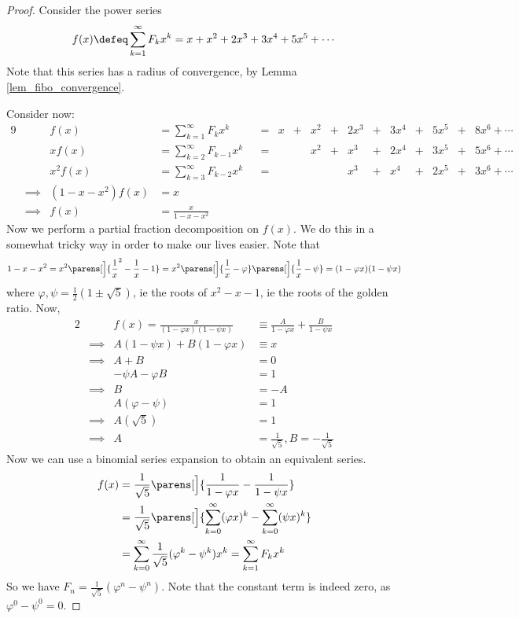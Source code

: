 \begin{proof}
 Consider the power series
 \begin{equation*}
  f(x) \defeq \sum_{k=1}^\infty F_k x^k = x + x^2 + 2x^3 + 3x^4 + 5x^5
      + \dotsb
 \end{equation*}
 Note that this series has a radius of convergence, by Lemma
 \ref{lem_fibo_convergence}.

 Consider now:
 \begin{alignat*}9
  && f(x) &= \sum_{k = 1}^\infty F_k x^k
      &&={}& x &+{}& x^2 &+{}& 2x^3 &+{}&
          3x^4 &+{}& 5x^5 &+{}& 8x^6 + \dotsb \\
  && x f(x) &= \sum_{k = 2}^\infty F_{k - 1} x^k
      &&={}& &&x^2 &+{}& x^3 &+{}& 2x^4 &+{}&
          3x^5 &+{}& 5x^6 + \dotsb \\
  && x^2 f(x) &= \sum_{k = 3}^\infty F_{k - 2}x^k
      &&={}& &&&& x^3 &+{}& x^4 &+{}& 2x^5 &+{}& 3x^6 + \dotsb \\
  &\implies{}& (1 - x - x^2) f(x) &= x \\
  &\implies{}& f(x) &= \frac x{1 - x - x^2}
 \end{alignat*}
 Now we perform a partial fraction decomposition on \(f(x)\). We do this in a
 somewhat tricky way in order to make our lives easier. Note that
 \begin{equation*}
  1 - x - x^2 = x^2 \parens[\Big]{\frac 1x^2 - \frac 1x - 1}
      = x^2\parens[\Big]{\frac 1x - \varphi}\parens[\Big]{\frac 1x - \psi}
      = (1 - \varphi x)(1 - \psi x)
 \end{equation*}
 where \(\varphi, \psi = \frac 12(1 \pm \sqrt 5)\), ie the roots of
 \(x^2 - x - 1\), ie the roots of the golden ratio. Now,
 \begin{alignat*}2
  && f(x) = \frac x{(1 - \varphi x)(1 - \psi x)}
      &\equiv \frac A{1 - \varphi x} + \frac B{1 - \psi x} \\
  &\implies{}& A(1 - \psi x) + B(1 - \varphi x) &\equiv x \\
  &\implies{}& A + B &= 0 \\
  && -\psi A - \varphi B &= 1 \\
  &\implies{}& B &= -A  \\
  && A(\varphi - \psi) &= 1 \\
  &\implies{}& A(\sqrt 5) &= 1 \\
  &\implies{}& A &= \frac 1{\sqrt 5}, B = -\frac 1{\sqrt 5}
 \end{alignat*}
 Now we can use a binomial series expansion to obtain an equivalent series.
 \begin{align*}
  f(x) &= \frac 1{\sqrt 5}\parens[\Big]{\frac 1{1 - \varphi x}
                              - \frac 1{1 - \psi x}} \\
  &= \frac 1{\sqrt 5}\parens[\Big]{\sum_{k = 0}^\infty (\varphi x)^k
                      - \sum_{k = 0}^\infty (\psi x)^k} \\
  &= \sum_{k = 0}^\infty \frac 1{\sqrt 5}(\varphi^k - \psi^k)x^k
  = \sum_{k = 1}^\infty F_k x^k
 \end{align*}
 So we have \(F_n = \frac 1{\sqrt 5}(\varphi^n - \psi^n)\). Note that the
 constant term is indeed zero, as \(\varphi^0 - \psi^0 = 0\).
\end{proof}
